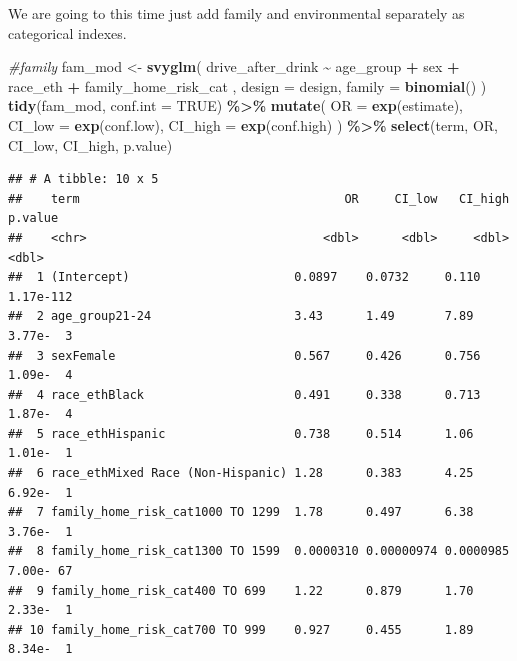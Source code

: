 \documentclass[
]{article}
\newenvironment{Shaded}{\begin{snugshade}}{\end{snugshade}}
\newcommand{\AttributeTok}[1]{\textcolor[rgb]{0.13,0.29,0.53}{#1}}
\newcommand{\CommentTok}[1]{\textcolor[rgb]{0.56,0.35,0.01}{\textit{#1}}}
\newcommand{\ConstantTok}[1]{\textcolor[rgb]{0.56,0.35,0.01}{#1}}
\newcommand{\FunctionTok}[1]{\textcolor[rgb]{0.13,0.29,0.53}{\textbf{#1}}}
\newcommand{\NormalTok}[1]{#1}
\newcommand{\OtherTok}[1]{\textcolor[rgb]{0.56,0.35,0.01}{#1}}
\newcommand{\SpecialCharTok}[1]{\textcolor[rgb]{0.81,0.36,0.00}{\textbf{#1}}}
\begin{document}
We are going to this time just add family and environmental separately
as categorical indexes.

\begin{Shaded}
\begin{Highlighting}[]
\CommentTok{\#family }
\NormalTok{fam\_mod }\OtherTok{\textless{}{-}} \FunctionTok{svyglm}\NormalTok{(}
\NormalTok{  drive\_after\_drink }\SpecialCharTok{\textasciitilde{}}\NormalTok{ age\_group }\SpecialCharTok{+}\NormalTok{ sex }\SpecialCharTok{+}\NormalTok{ race\_eth }\SpecialCharTok{+}
\NormalTok{  family\_home\_risk\_cat ,}
  \AttributeTok{design =}\NormalTok{ design,}
  \AttributeTok{family =} \FunctionTok{binomial}\NormalTok{()}
\NormalTok{)  }
\FunctionTok{tidy}\NormalTok{(fam\_mod, }\AttributeTok{conf.int =} \ConstantTok{TRUE}\NormalTok{) }\SpecialCharTok{\%\textgreater{}\%}
  \FunctionTok{mutate}\NormalTok{(}
    \AttributeTok{OR =} \FunctionTok{exp}\NormalTok{(estimate),}
    \AttributeTok{CI\_low =} \FunctionTok{exp}\NormalTok{(conf.low),}
    \AttributeTok{CI\_high =} \FunctionTok{exp}\NormalTok{(conf.high)}
\NormalTok{  ) }\SpecialCharTok{\%\textgreater{}\%}
  \FunctionTok{select}\NormalTok{(term, OR, CI\_low, CI\_high, p.value)}
\end{Highlighting}
\end{Shaded}

\begin{verbatim}
## # A tibble: 10 x 5
##    term                                     OR     CI_low   CI_high   p.value
##    <chr>                                 <dbl>      <dbl>     <dbl>     <dbl>
##  1 (Intercept)                       0.0897    0.0732     0.110     1.17e-112
##  2 age_group21-24                    3.43      1.49       7.89      3.77e-  3
##  3 sexFemale                         0.567     0.426      0.756     1.09e-  4
##  4 race_ethBlack                     0.491     0.338      0.713     1.87e-  4
##  5 race_ethHispanic                  0.738     0.514      1.06      1.01e-  1
##  6 race_ethMixed Race (Non-Hispanic) 1.28      0.383      4.25      6.92e-  1
##  7 family_home_risk_cat1000 TO 1299  1.78      0.497      6.38      3.76e-  1
##  8 family_home_risk_cat1300 TO 1599  0.0000310 0.00000974 0.0000985 7.00e- 67
##  9 family_home_risk_cat400 TO 699    1.22      0.879      1.70      2.33e-  1
## 10 family_home_risk_cat700 TO 999    0.927     0.455      1.89      8.34e-  1
\end{verbatim}
\end{document}
